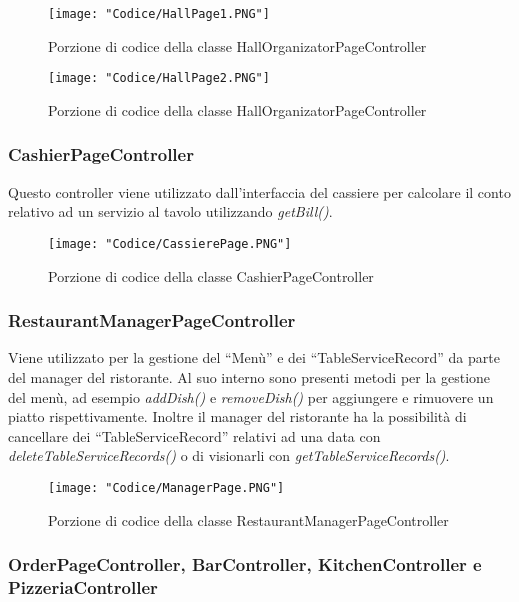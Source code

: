 \documentclass{article}
\begin{document}
\begin{figure}[!h]
\centering
\texttt{[image: "Codice/HallPage1.PNG"]}
\caption{Porzione di codice della classe HallOrganizatorPageController}
\end{figure}

\begin{figure}[!h]
\centering
\texttt{[image: "Codice/HallPage2.PNG"]}
\caption{Porzione di codice della classe HallOrganizatorPageController}
\end{figure}

\newpage

\subsubsection{CashierPageController}

Questo controller viene utilizzato dall'interfaccia del cassiere per calcolare il conto relativo ad un servizio al tavolo utilizzando \textit{getBill()}.

\begin{figure}[!h]
\centering
\texttt{[image: "Codice/CassierePage.PNG"]}
\caption{Porzione di codice della classe CashierPageController}
\end{figure}

\newpage

\subsubsection{RestaurantManagerPageController}

Viene utilizzato per la gestione del ``Men\`u'' e dei ``TableServiceRecord'' da parte del manager del ristorante. Al suo interno sono presenti metodi per la gestione del men\`u, ad esempio \textit{addDish()} e \textit{removeDish()} per aggiungere e rimuovere un piatto rispettivamente. Inoltre il manager del ristorante ha la possibilit\`a di cancellare dei ``TableServiceRecord'' relativi ad una data con \textit{deleteTableServiceRecords()} o di visionarli con \textit{getTableServiceRecords()}.

\begin{figure}[!h]
\centering
\texttt{[image: "Codice/ManagerPage.PNG"]}
\caption{Porzione di codice della classe RestaurantManagerPageController}
\end{figure}

\newpage


\subsubsection{OrderPageController, BarController, KitchenController e PizzeriaController}
\end{document}
